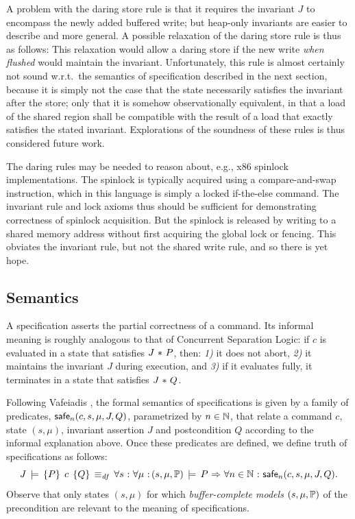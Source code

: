\documentclass[11pt]{report}
\begin{document}
A problem with the daring store rule is that it requires the invariant $J$ to encompass the newly added buffered write; but heap-only invariants are easier to describe and more general. A possible relaxation of the daring store rule is thus as follows: 
This relaxation would allow a daring store if the new write \emph{when flushed} would maintain the invariant. Unfortunately, this rule is almost certainly not sound w.r.t.\ the semantics of specification described in the next section, because it is simply not the case that the state necessarily satisfies the invariant after the store; only that it is somehow observationally equivalent, in that a load of the shared region shall be  compatible with the result of a load that exactly satisfies the stated invariant. Explorations of the soundness of these rules is thus considered future work. 

The daring rules may be needed to reason about, e.g., x86 spinlock implementations. The spinlock is typically acquired using a compare-and-swap instruction, which in this language is simply a locked if-the-else command. The invariant rule and lock axioms thus should be sufficient for demonstrating correctness of spinlock acquisition. But the spinlock is released by writing to a shared memory address without first acquiring the global lock or fencing. This obviates the invariant rule, but not the shared write rule, and so there is yet hope. 

\subsection{Semantics}
\label{sec:specification-semantics}

A specification asserts the partial correctness of a command. Its informal meaning is roughly analogous to that of Concurrent Separation Logic: if $c$ is evaluated in a state that satisfies $J \operatorname{\,\ast\,} P$, then: \emph{1)} it does not abort, \emph{2)} it maintains the invariant $J$ during execution, and \emph{3)} if it evaluates fully, it terminates in a state that satisfies $J \operatorname{\,\ast\,} Q$. 

Following Vafeiadis \cite{V11}, the formal semantics of specifications is given by a family of predicates, $\mathsf{safe}_{n}(c,s,\mu,J,Q)$, parametrized by $n \in \mathbb{N}$, that relate a command $c$, state $(s,\mu)$, invariant assertion $J$ and postcondition $Q$ according to the informal explanation above. Once these predicates are defined, we define truth of specifications as follows: \[ J\,\models\,\left\lbrace P \right\rbrace\;c\;\left\lbrace Q \right\rbrace \operatorname{\;\equiv_{\mathit{df}}\;} \forall s \operatorname{\,:\,} \forall \mu \operatorname{\,:\,} (s,\mu,\mathbb{P})\,\models\, P \operatorname{\,\Rightarrow\,} \forall n \in \mathbb{N} \operatorname{\,:\,} \mathsf{safe}_{n}(c,s,\mu,J,Q).\] Observe that only states $(s,\mu)$ for which \emph{buffer-complete models} $(s,\mu,\mathbb{P})$ of the precondition are relevant to the meaning of specifications. 
\end{document}
